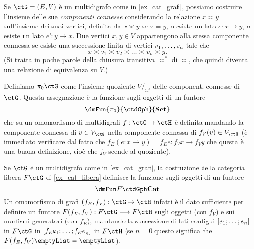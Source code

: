 \begin{example}
	Se \(\ctG=(E,V)\) è un multidigrafo come in \ref{ex_cat_grafi}, possiamo costruire l'insieme delle sue \emph{componenti connesse} considerando la relazione \(x\asymp y\) sull'insieme dei suoi vertici, definita da \(x\asymp y\) se \(x=y\), o esiste un lato \(e : x \to y\), o esiste un lato \(e' : y\to x\). Due vertici \(x,y\in V\) appartengono alla stessa componente connessa se esiste una successione finita di vertici \(\tup vn,\) tale che
	\[x \asymp v_1 \asymp v_2 \asymp\dots\asymp v_n\asymp y.\]
	(Si tratta in poche parole della chiusura transitiva \(\asymp^*\) di \(\asymp\), che quindi diventa una relazione di equivalenza su \(V\).)

	Definiamo \(\pi_0\ctG\) come l'insieme quoziente \(V/_{\asymp^*}\) delle componenti connesse di \(\ctG\). Questa assegnazione è la funzione sugli oggetti di un funtore
	\[\dmFun{\pi_0}{\ctdGph}{\ctSet}\]
	che su un omomorfismo di multidigrafi \(f : \ctG \to\ctH\) è definita mandando la componente connessa di \(v\in V_\ctG\) nella componente connessa di \(f_V(v)\in V_\ctH\) (è immediato verificare dal fatto che \(f_E(e : x\to y)=f_Ee : f_Vx\to f_Vy\) che questa è una buona definizione, cioè che \(f_V\) scende al quoziente).
\end{example}
\begin{example}
	Se \(\ctG\) è un multidigrafo come in \ref{ex_cat_grafi}, la costruzione della categoria libera \(F\ctG\) di \ref{ex_cat_libera} definisce la funzione sugli oggetti di un funtore
	\[\dmFun F\ctdGph\ctCat\]
	Un omomorfismo di grafi \((f_E,f_V) : \ctG \to \ctH\) infatti è il dato sufficiente per definire un funtore \(F(f_E,f_V) : F\ctG \fun F\ctH\) sugli oggetti (con \(f_V\)) e sui morfismi generatori (con \(f_E\)), mandando la successione di lati contigui \([\tup en;]\) in \(F\ctG\) in \([\tup {{f_E}e}n;]\) in \(F\ctH\) (se \(n=0\) questo significa che \(F(f_E,f_V)\emptyList = \emptyList\)).
\end{example}
\begin{example}
	\Todo{}
\end{example}

